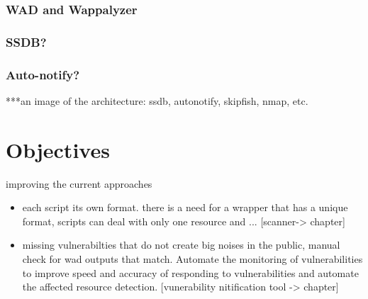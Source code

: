 \subsubsection{WAD and Wappalyzer}
\subsubsection{SSDB?}
\subsubsection{Auto-notify?}

***an image of the architecture: ssdb, autonotify, skipfish, nmap, etc.


\section{Objectives}
improving the current approaches
\begin{itemize}
\item each script its own format. there is a need for a wrapper that has a unique format, scripts can deal with only one resource and ... [scanner-> chapter]
\item missing vulnerabilties that do not create big noises in the public, manual check for wad outputs that match. Automate the monitoring of vulnerabilities to improve speed and accuracy of responding to vulnerabilities and automate the affected resource detection. [vunerability nitification tool -> chapter]
\end{itemize}


























